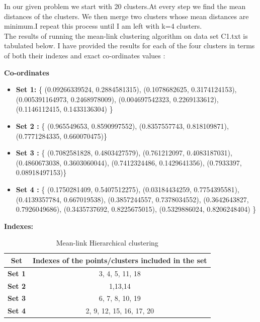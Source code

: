 \documentclass[11pt]{article}
\begin{document}
\begin{itemize}
	In our given problem we start with 20 clusters.At every step we find the mean distances of the clusters. We then merge two  clusters whose mean distances are minimum.I repeat this process until I am left with k=4 clusters.\\
	
	The results of running the mean-link clustering algorithm on data set C1.txt is tabulated below. I have provided the results for each of the four clusters in terms of both their indexes and exact co-ordinates values :
	
	\textbf{ Co-ordinates}
	
	\begin{itemize}
		\item[]	\textbf{Set 1:}  \{  (0.09266339524, 0.2884581315), (0.1078682625, 0.3174124153), (0.005391164973, 0.2468978009), (0.004697542323, 0.2269133612), (0.1146112415, 0.1433136304) \}\\
		
		\item[] \textbf{Set 2 :}  \{ (0.965549653, 0.8590997552), (0.8357557743, 0.818109871), (0.7771284335, 0.660070475)\}   \\
		
		\item[] \textbf{Set 3 :}  \{  (0.7082581828, 0.4803427579), (0.761212097, 0.4083187031), (0.4860673038, 0.3603060044), (0.7412324486, 0.1429641356), (0.7933397, 0.08918497153)\}
		
		\item[] \textbf{Set 4 :}  \{  (0.1750281409, 0.5407512275), (0.03184434259, 0.7754395581), (0.4139357784, 0.667019538), (0.3857244557, 0.7378034552), (0.3642643827, 0.7926049686), (0.3435737692, 0.8225675015), (0.5329886024, 0.8206248404)  \}
		
	\end{itemize}
	
	\textbf{Indexes:}
	
	\begin{table}[h]
		\centering
		\begin{tabular}{|c|c|}
			\hline
			\textbf{Set}  & \textbf{Indexes of the points/clusters included in the set} \\
			\hline
			\textbf{Set 1}  & 3, 4, 5, 11, 18\\
			\hline
			\textbf{Set 2} & 1,13,14   \\
			\hline
			\textbf{Set 3} &  6, 7, 8, 10, 19  \\
			\hline
			\textbf{Set 4}  & 2, 9, 12, 15, 16, 17, 20   \\
			\hline
		\end{tabular}
		\caption{Mean-link Hierarchical clustering }
		\label{t2}
	\end{table}
	

\end{itemize}
\end{document}
